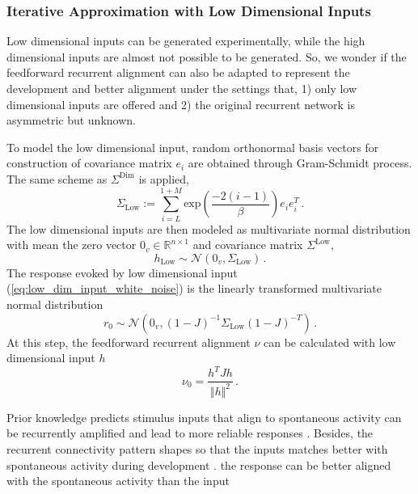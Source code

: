 \documentclass[11pt]{article}
\begin{document}
	\subsubsection{Iterative Approximation with Low Dimensional Inputs}
	Low dimensional inputs can be generated experimentally, while the high dimensional inputs are almost not possible to be generated. So, we wonder if the feedforward recurrent alignment can also be adapted to represent the development and better alignment under the settings that, 1) only low dimensional inputs are offered and 2) the original recurrent network is asymmetric but unknown.
	
	To model the low dimensional input, random orthonormal basis vectors for construction of covariance matrix $e_i$ are obtained through Gram-Schmidt process. The same scheme as $\Sigma^{\text{Dim}}$ is applied, 
		\begin{equation}
			\Sigma_{\text{Low}} := \sum_{i=L}^{1+M} \text{exp}\left(\frac{-2(i-1)}{\beta}\right) e_i e_i^T \, .
		\end{equation}
	The low dimensional inputs are then modeled as multivariate normal distribution with mean the zero vector $0_v \in \mathbb{R}^{n \times 1}$ and covariance matrix $\Sigma^{\text{Low}}$, 
		\begin{equation} \label{eq:low_dim_input_white_noise}
			h_{\text{Low}} \sim \mathcal{N}(0_v, \Sigma_{\text{Low}}) \, .
		\end{equation}
	The response evoked by low dimensional input (\ref{eq:low_dim_input_white_noise}) is the linearly transformed multivariate normal distribution
		\begin{equation}
			r_0 \sim \mathcal{N}\left( 0_v, (1-J)^{-1} \Sigma_{\text{Low}} (1-J)^{-T} \right) \, .
		\end{equation}
	At this step, the feedforward recurrent alignment $\nu$ can be calculated with low dimensional input $h$ 
		\begin{equation}
			\nu_0 = \frac{h^T J h}{\Vert h \Vert^2} \,.
		\end{equation} 
	
	Prior knowledge predicts stimulus inputs that align to spontaneous activity can be recurrently amplified and lead to more reliable responses \cite{mulholland2023selective}. Besides, the recurrent connectivity pattern shapes so that the inputs matches better with spontaneous activity during development \cite{marre2009reliable}. 
	the response can be better aligned with the spontaneous activity than the input %
	
\end{document}
